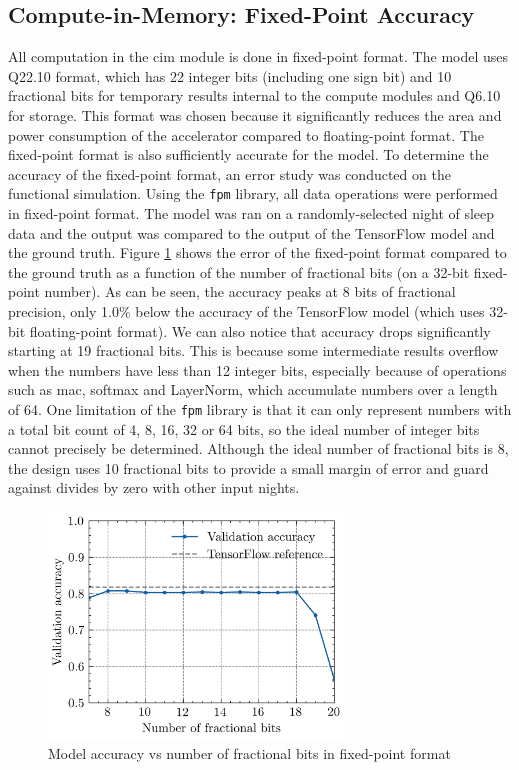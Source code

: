 \subsection{Compute-in-Memory: Fixed-Point Accuracy}
All computation in the \ac{cim} module is done in fixed-point format. The model uses Q22.10 format, which has 22 integer bits (including one sign bit) and 10 fractional bits for 
temporary results internal to the compute modules and Q6.10 for storage. This format was chosen because it significantly reduces the area and power consumption of the accelerator compared
to floating-point format. The fixed-point format is also sufficiently accurate for the model. To determine the accuracy of the fixed-point format, an error study was conducted on the
functional simulation. Using the \texttt{fpm} library, all data operations were performed in fixed-point format. The model was ran on a randomly-selected night of sleep data and the output
was compared to the output of the TensorFlow model and the ground truth. Figure \ref{fig:fixed_point_error} shows the error of the fixed-point format compared to the ground truth as a
function of the number of fractional bits (on a 32-bit fixed-point number). As can be seen, the accuracy peaks at 8 bits of fractional precision, only 1.0\% below the accuracy of the
TensorFlow model (which uses 32-bit floating-point format). We can also notice that accuracy drops significantly starting at 19 fractional bits. This is because some intermediate results
overflow when the numbers have less than 12 integer bits, especially because of operations such as \ac{mac}, softmax and LayerNorm, which accumulate numbers over a length of 64. One
limitation of the \texttt{fpm} library is that it can only represent numbers with a total bit count of 4, 8, 16, 32 or 64 bits, so the ideal number of integer bits cannot precisely be
determined. Although the ideal number of fractional bits is 8, the design uses 10 fractional bits to provide a small margin of error and guard against divides by zero with other input nights.

\begin{figure}
    \centering
    \includegraphics[width=0.7\textwidth]{assets/fixed_point_acc/fixed_point_acc.png}
    \caption{Model accuracy vs number of fractional bits in fixed-point format}
    \label{fig:fixed_point_error}
\end{figure}

